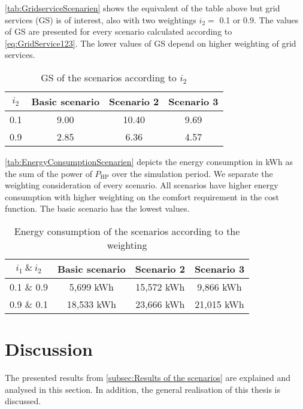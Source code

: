 \autoref{tab:GridserviceScenarien} shows the equivalent of the table above but grid services (GS) is of interest, also with two weightings  $i_\text{2} =$ 0.1 or 0.9. The values of GS are presented for every scenario calculated according to \autoref{eq:GridService123}. The lower values of GS depend on higher weighting of grid services. 
    \begin{table}[H]
        \centering
        \begin{tabular}{c||c|c|c}
          $i_\text{2}$  &  Basic scenario & Scenario 2 & Scenario 3\\
          \hline  \hline
             0.1 & 9.00 & 10.40 & 9.69 \\
             0.9 & 2.85 & 6.36 & 4.57\\
        \end{tabular}
        \caption{GS of the scenarios according to $i_\text{2}$}
        \label{tab:GridserviceScenarien}
    \end{table}
    
\autoref{tab:EnergyConsumptionScenarien} depicts the energy consumption in kWh as the sum of the power of $P_\text{HP}$ over the simulation period. We separate the weighting consideration of every scenario. All scenarios have higher energy consumption with higher weighting on the comfort requirement in the cost function. The basic scenario has the lowest values. 
    \begin{table}[H]
        \centering
        \begin{tabular}{c||c|c|c}
          $i_\text{1} \ \& \  i_\text{2}$  &  Basic scenario & Scenario 2 & Scenario 3\\
          \hline  \hline
             0.1 \& 0.9 & 5,699 kWh & 15,572 kWh & 9,866 kWh\\
             0.9 \& 0.1 & 18,533 kWh & 23,666 kWh & 21,015 kWh\\
        \end{tabular}
        \caption{Energy consumption of the scenarios according to the weighting}
        \label{tab:EnergyConsumptionScenarien}
    \end{table}

\section{Discussion}
\label{sec:discussion}
The presented results from \autoref{subsec:Results of the scenarios} are explained and analysed in this section. In addition, the general realisation of this thesis is discussed.


